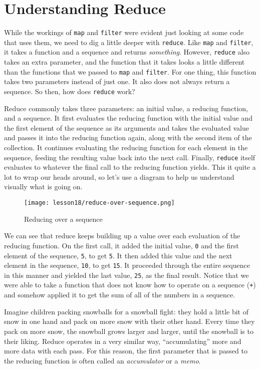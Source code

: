 \documentclass[10pt,twoside,openright]{memoir}
\begin{document}
\section{Understanding Reduce}

While the workings of \texttt{map} and \texttt{filter} were evident just
looking at some code that uses them, we need to dig a little deeper with
\texttt{reduce}. Like \texttt{map} and \texttt{filter}, it takes a
function and a sequence and returns \emph{something}. However,
\texttt{reduce} also takes an extra parameter, and the function that it
takes looks a little different than the functions that we passed to
\texttt{map} and \texttt{filter}. For one thing, this function takes two
parameters instead of just one. It also does not always return a
sequence. So then, how does \texttt{reduce} work?

Reduce commonly takes three parameters: an initial value, a reducing
function, and a sequence. It first evaluates the reducing function with
the initial value and the first element of the sequence as its arguments
and takes the evaluated value and passes it into the reducing function
again, along with the second item of the collection. It continues
evaluating the reducing function for each element in the sequence,
feeding the resulting value back into the next call. Finally,
\texttt{reduce} itself evaluates to whatever the final call to the
reducing function yields. This it quite a lot to wrap our heads around,
so let's use a diagram to help us understand visually what is going on.

\begin{figure}[H]
\caption{Reducing over a sequence}
\centering
\texttt{[image: lesson18/reduce-over-sequence.png]}
\end{figure}

We can see that reduce keeps building up a value over each evaluation of
the reducing function. On the first call, it added the initial value,
\texttt{0} and the first element of the sequence, \texttt{5}, to get
\texttt{5}. It then added this value and the next element in the
sequence, \texttt{10}, to get \texttt{15}. It proceeded through the
entire sequence in this manner and yielded the last value, \texttt{25},
as the final result. Notice that we were able to take a function that
does not know how to operate on a sequence (\texttt{+}) and somehow
applied it to get the sum of all of the numbers in a sequence.

Imagine children packing snowballs for a snowball fight: they hold a
little bit of snow in one hand and pack on more snow with their other
hand. Every time they pack on more snow, the snowball grows larger and
larger, until the snowball is to their liking. Reduce operates in a very
similar way, ``accumulating'' more and more data with each pass. For
this reason, the first parameter that is passed to the reducing function
is often called an \emph{accumulator} or a \emph{memo}.
\end{document}
